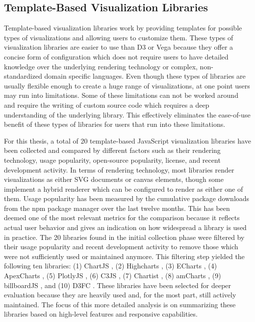 \subsection{Template-Based Visualization Libraries}

Template-based visualization libraries work by providing templates for possible types of visualizations and allowing users to customize them.
These types of visualization libraries are easier to use than D3 or Vega because they offer a concise form of configuration which does not require users to have detailed knowledge over the underlying rendering technology or complex, non-standardized domain specific languages.
Even though these types of libraries are usually flexible enough to create a huge range of visualizations, at one point users may run into limitations.
Some of these limitations can not be worked around and require the writing of custom source code which requires a deep understanding of the underlying library.
This effectively eliminates the ease-of-use benefit of these types of libraries for users that run into these limitations.

For this thesis, a total of 20 template-based JavaScript visualization libraries have been collected and compared by different factors such as their rendering technology, usage popularity, open-source popularity, license, and recent development activity.
In terms of rendering technology, most libraries render visualizations as either SVG documents or canvas elements, though some implement a hybrid renderer which can be configured to render as either one of them.
Usage popularity has been measured by the cumulative package downloads from the npm package manager over the last twelve months.
This has been deemed one of the most relevant metrics for the comparison because it reflects actual user behavior and gives an indication on how widespread a library is used in practice.
The 20 libraries found in the initial collection phase were filtered by their usage popularity and recent development activity to remove those which were not sufficiently used or maintained anymore.
This filtering step yielded the following ten libraries: (1) ChartJS \parencite{ChartJS}, (2) Highcharts \parencite{Highcharts}, (3) ECharts \parencite{ECharts}, (4) ApexCharts \parencite{ApexCharts}, (5) PlotlyJS \parencite{PlotlyJS}, (6) C3JS \parencite{C3JS}, (7) Chartist \parencite{Chartist}, (8) amCharts \parencite{amCharts}, (9) billboardJS \parencite{billboardJS}, and (10) D3FC \parencite{D3FC}.
These libraries have been selected for deeper evaluation because they are heavily used and, for the most part, still actively maintained.
The focus of this more detailed analysis is on summarizing these libraries based on high-level features and responsive capabilities.


